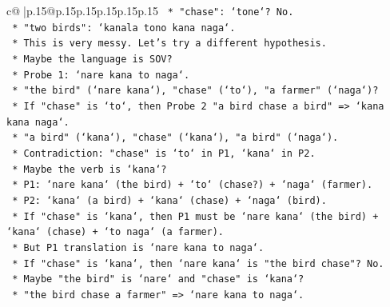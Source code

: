 \documentclass{article}
\begin{document}
{\begin{supertabular}{c@{$\;$}|p{.15\linewidth}@{}p{.15\linewidth}p{.15\linewidth}p{.15\linewidth}p{.15\linewidth}p{.15\linewidth}}
{{{\texttt{                                                *   "chase": `tone`? No.} \\
\texttt{                                                *   "two birds": `kanala tono kana naga`.} \\
\texttt{                                                *   This is very messy. Let's try a different hypothesis.} \\
\texttt{                                                *   Maybe the language is SOV?} \\
\texttt{                                                *   Probe 1: `nare kana to naga`.} \\
\texttt{                                                    *   "the bird" (`nare kana`), "chase" (`to`), "a farmer" (`naga`)?} \\
\texttt{                                                    *   If "chase" is `to`, then Probe 2 "a bird chase a bird" => `kana kana naga`.} \\
\texttt{                                                        *   "a bird" (`kana`), "chase" (`kana`), "a bird" (`naga`).} \\
\texttt{                                                        *   Contradiction: "chase" is `to` in P1, `kana` in P2.} \\
\texttt{                                                *   Maybe the verb is `kana`?} \\
\texttt{                                                    *   P1: `nare kana` (the bird) + `to` (chase?) + `naga` (farmer).} \\
\texttt{                                                    *   P2: `kana` (a bird) + `kana` (chase) + `naga` (bird).} \\
\texttt{                                                    *   If "chase" is `kana`, then P1 must be `nare kana` (the bird) + `kana` (chase) + `to naga` (a farmer).} \\
\texttt{                                                    *   But P1 translation is `nare kana to naga`.} \\
\texttt{                                                    *   If "chase" is `kana`, then `nare kana` is "the bird chase"? No.} \\
\texttt{                                                    *   Maybe "the bird" is `nare` and "chase" is `kana`?} \\
\texttt{                                                    *   "the bird chase a farmer" => `nare kana to naga`.} \\
}}}
\end{supertabular}}
\end{document}

